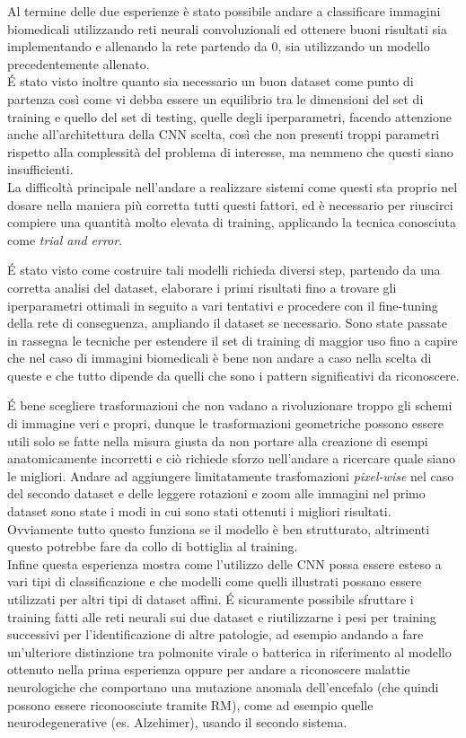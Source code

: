 Al termine delle due esperienze è stato possibile andare a classificare immagini biomedicali utilizzando reti neurali 
convoluzionali ed ottenere buoni risultati sia implementando e allenando la rete partendo da 0, sia utilizzando un modello
precedentemente allenato. \\
É stato visto inoltre quanto sia necessario un buon dataset come punto di partenza così come vi debba essere un equilibrio tra le dimensioni
del set di training e quello del set di testing, quelle degli iperparametri, facendo attenzione anche all'architettura della CNN scelta,
 così che non presenti troppi parametri rispetto alla complessità del problema di interesse, ma nemmeno che questi siano insufficienti.\\
La difficoltà  principale nell'andare a realizzare sistemi come questi sta proprio nel dosare nella maniera più corretta tutti questi fattori, ed è necessario 
per riuscirci compiere una quantità molto elevata di training, applicando la tecnica conosciuta come \emph{trial and error}. 

É stato visto come costruire tali modelli richieda diversi step, partendo da una corretta analisi del dataset, 
elaborare i primi risultati fino a trovare gli iperparametri ottimali in seguito a vari tentativi e procedere con il fine-tuning della rete di conseguenza,
 ampliando il dataset se necessario.
Sono state passate in rassegna le tecniche per estendere il set di training di maggior uso fino a capire che nel caso di immagini biomedicali
è bene non andare a caso nella scelta di queste e che tutto dipende da quelli che sono i pattern significativi da riconoscere.
 
É bene scegliere trasformazioni che non vadano a rivoluzionare troppo gli schemi di immagine veri e propri, dunque le trasformazioni geometriche
possono essere utili solo se fatte nella misura giusta da non portare alla creazione di esempi anatomicamente incorretti
 e ciò richiede sforzo nell'andare a ricercare quale siano le migliori. 
Andare ad aggiungere limitatamente trasfomazioni \emph{pixel-wise} nel caso del secondo dataset e delle leggere rotazioni e zoom alle immagini nel primo dataset 
sono state i modi in cui sono stati ottenuti i migliori risultati. \\
Ovviamente tutto questo funziona se il modello è ben strutturato, altrimenti questo potrebbe fare da collo di bottiglia al training.\\
Infine questa esperienza mostra come l'utilizzo delle CNN possa essere esteso a vari tipi di classificazione e che 
modelli come quelli illustrati possano essere utilizzati per altri tipi di dataset affini. É sicuramente possibile sfruttare
i training fatti alle reti neurali sui due dataset e riutilizzarne i pesi per training successivi
 per l'identificazione di altre patologie, 
ad esempio andando a fare un'ulteriore distinzione
tra polmonite virale o batterica in riferimento al modello ottenuto nella prima esperienza oppure per andare a
 riconoscere malattie neurologiche che comportano una mutazione anomala dell'encefalo (che quindi possono essere riconoosciute tramite RM), 
 come ad esempio quelle neurodegenerative (es. Alzehimer), usando il secondo sistema.
 
